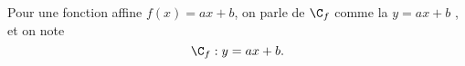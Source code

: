 
\begin{rpl}
	Pour une fonction affine $f(x) = ax+b$, on parle de $\C_f$ comme la  $y=ax+b$ \fg, et on note
		\[ \C_f : y = ax+b. \]
\end{rpl}


